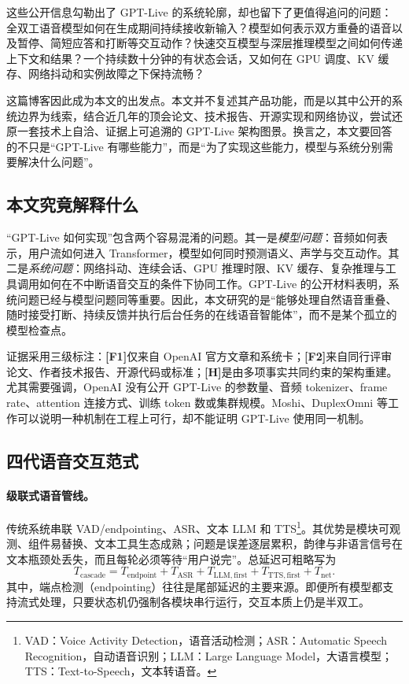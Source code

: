 \documentclass[UTF8,fontset=none,a4paper,10pt]{ctexart}
\newcommand{\FOne}{\textcolor{official}{\textbf{[F1]}}}
\newcommand{\FTwo}{\textcolor{public}{\textbf{[F2]}}}
\newcommand{\Hyp}{\textcolor{hypothesis}{\textbf{[H]}}}
\begin{document}
这些公开信息勾勒出了 GPT-Live 的系统轮廓，却也留下了更值得追问的问题：全双工语音模型如何在生成期间持续接收新输入？模型如何表示双方重叠的语音以及暂停、简短应答和打断等交互动作？快速交互模型与深层推理模型之间如何传递上下文和结果？一个持续数十分钟的有状态会话，又如何在 GPU 调度、KV 缓存、网络抖动和实例故障之下保持流畅？

这篇博客因此成为本文的出发点。本文并不复述其产品功能，而是以其中公开的系统边界为线索，结合近几年的顶会论文、技术报告、开源实现和网络协议，尝试还原一套技术上自洽、证据上可追溯的 GPT-Live 架构图景。换言之，本文要回答的不只是“GPT-Live 有哪些能力”，而是“为了实现这些能力，模型与系统分别需要解决什么问题”。

\subsection{本文究竟解释什么}

“GPT-Live 如何实现”包含两个容易混淆的问题。其一是\emph{模型问题}：音频如何表示，用户流如何进入 Transformer，模型如何同时预测语义、声学与交互动作。其二是\emph{系统问题}：网络抖动、连续会话、GPU 推理时限、KV 缓存、复杂推理与工具调用如何在不中断语音交互的条件下协同工作。GPT-Live 的公开材料表明，系统问题已经与模型问题同等重要\cite{zh:openai2026gptlive,zh:openai2026continuous}。因此，本文研究的是“能够处理自然语音重叠、随时接受打断、持续反馈并执行后台任务的在线语音智能体”，而不是某个孤立的模型检查点。

证据采用三级标注：\FOne 仅来自 OpenAI 官方文章和系统卡；\FTwo 来自同行评审论文、作者技术报告、开源代码或标准；\Hyp 是由多项事实共同约束的架构重建。尤其需要强调，OpenAI 没有公开 GPT-Live 的参数量、音频 tokenizer、frame rate、attention 连接方式、训练 token 数或集群规模。Moshi、DuplexOmni 等工作可以说明一种机制在工程上可行，却不能证明 GPT-Live 使用同一机制。

\subsection{四代语音交互范式}

\paragraph{级联式语音管线。}
传统系统串联 VAD/endpointing、ASR、文本 LLM 和 TTS\footnote{VAD：Voice Activity Detection，语音活动检测；ASR：Automatic Speech Recognition，自动语音识别；LLM：Large Language Model，大语言模型；TTS：Text-to-Speech，文本转语音。}。其优势是模块可观测、组件易替换、文本工具生态成熟；问题是误差逐层累积，韵律与非语言信号在文本瓶颈处丢失，而且每轮必须等待“用户说完”。总延迟可粗略写为
\begin{equation}
T_{\mathrm{cascade}}=T_{\mathrm{endpoint}}+T_{\mathrm{ASR}}+T_{\mathrm{LLM,first}}+T_{\mathrm{TTS,first}}+T_{\mathrm{net}}.
\end{equation}
其中，端点检测（endpointing）往往是尾部延迟的主要来源。即便所有模型都支持流式处理，只要状态机仍强制各模块串行运行，交互本质上仍是半双工。
\end{document}
